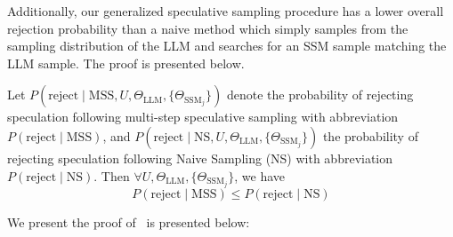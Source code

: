 Additionally, our generalized speculative sampling procedure has a lower overall rejection probability than a naive method which simply samples from the sampling distribution of the LLM and searches for an SSM sample matching the LLM sample. The proof is presented below.
\fi


\begin{theorem}
    Let $P\left(\textrm{reject} \mid \textrm{MSS}, U, \Theta_{\textrm{LLM}}, \{\Theta_{\textrm{SSM}_j}\} \right)$ denote the probability of rejecting speculation following multi-step speculative sampling with abbreviation $P(\textrm{reject}\mid \textrm{MSS})$, and $P\left(\textrm{reject} \mid \textrm{NS}, U, \Theta_{\textrm{LLM}}, \{\Theta_{\textrm{SSM}_j}\}\right)$ the probability of rejecting speculation following Naive Sampling (NS) with abbreviation $P(\textrm{reject}\mid\textrm{NS})$. Then $\forall U, \Theta_{\textrm{LLM}}, \{\Theta_{\textrm{SSM}_j}\}$, we have $$P(\textrm{reject}\mid \textrm{MSS}) \leq P(\textrm{reject}\mid\textrm{NS})$$
\end{theorem}

We present the proof of~ is presented below:

